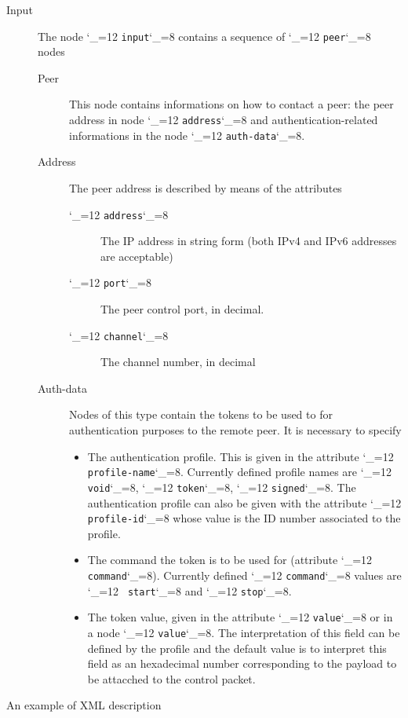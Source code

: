 \documentclass{rfc}
\def\ttt{\catcode`\_=12 \tttii}
\def\tttii#1!{{\tt #1}\catcode`\_=8{}}
\begin{document}
\begin{description}
\begin{description}
\end{description}
\item[Input] The node \ttt input! contains a sequence of \ttt peer!
  nodes
  \begin{description}
    \item[Peer]  This node contains  informations on how to contact a
    peer: the peer address in node \ttt address! and
    authentication-related informations in the node \ttt auth-data!. 
    \item[Address] The peer address is described by means of the
    attributes
    \begin{description}
      \item[\ttt address!] The IP address in string form (both IPv4
      and IPv6 addresses are acceptable)
      \item[\ttt port!] The peer control port, in decimal.
      \item[\ttt channel!] The channel number, in decimal
    \end{description}
   \item[Auth-data] Nodes of this type contain the tokens to be used
   to for authentication purposes to the remote peer.  It is necessary
   to specify
   \begin{itemize}
     \item The authentication profile.  This is given in the attribute
     \ttt profile-name!.  Currently defined profile names are \ttt
     void!, \ttt token!, \ttt signed!.  The authentication profile can
     also be given with the attribute \ttt profile-id! whose value is
     the ID number associated to the profile.
     \item The command the token is to be used for (attribute \ttt
     command!).  Currently defined \ttt command! values are \ttt
     start! and \ttt stop!.
    \item The token value, given in the attribute \ttt value! or in a
    node \ttt value!.  The interpretation of this field can be defined
    by the profile and the default value is to interpret this field as
    an hexadecimal number corresponding to the payload to be attacched
    to the control packet.
   \end{itemize}
  \end{description}
\end{description}
%

An example of XML description
\end{document}
